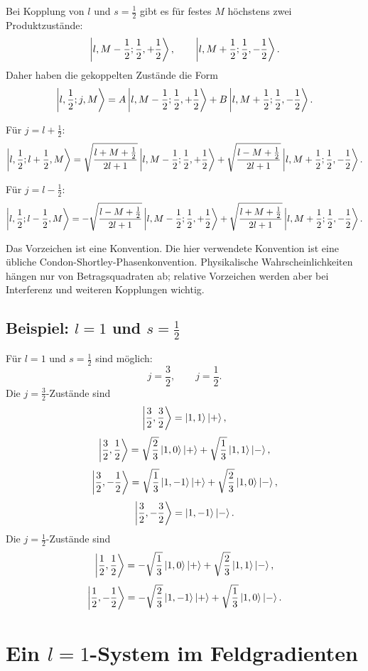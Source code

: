 Bei Kopplung von \(l\) und \(s=\frac12\) gibt es für festes \(M\) höchstens zwei Produktzustände:
\[
    \left|l,M-\frac12;\frac12,+\frac12\right\rangle,
    \qquad
    \left|l,M+\frac12;\frac12,-\frac12\right\rangle.
\]
Daher haben die gekoppelten Zustände die Form
\[
    \left|l,\frac12;j,M\right\rangle
    =A\left|l,M-\frac12;\frac12,+\frac12\right\rangle
    +B\left|l,M+\frac12;\frac12,-\frac12\right\rangle.
\]

Für \(j=l+\frac12\):
\[
    \left|l,\frac12;l+\frac12,M\right\rangle
    =\sqrt{\frac{l+M+\frac12}{2l+1}}
    \left|l,M-\frac12;\frac12,+\frac12\right\rangle
    +\sqrt{\frac{l-M+\frac12}{2l+1}}
    \left|l,M+\frac12;\frac12,-\frac12\right\rangle.
\]

Für \(j=l-\frac12\):
\[
    \left|l,\frac12;l-\frac12,M\right\rangle
    =-\sqrt{\frac{l-M+\frac12}{2l+1}}
    \left|l,M-\frac12;\frac12,+\frac12\right\rangle
    +\sqrt{\frac{l+M+\frac12}{2l+1}}
    \left|l,M+\frac12;\frac12,-\frac12\right\rangle.
\]

\begin{notebox}
Das Vorzeichen ist eine Konvention. Die hier verwendete Konvention ist eine übliche Condon-Shortley-Phasenkonvention. Physikalische Wahrscheinlichkeiten hängen nur von Betragsquadraten ab; relative Vorzeichen werden aber bei Interferenz und weiteren Kopplungen wichtig.
\end{notebox}

\subsection{Beispiel: \texorpdfstring{\(l=1\)}{l=1} und \texorpdfstring{\(s=\frac12\)}{s=1/2}}

Für \(l=1\) und \(s=\frac12\) sind möglich:
\[
    j=\frac32,
    \qquad
    j=\frac12.
\]
Die \(j=\frac32\)-Zustände sind
\[
    \left|\frac32,\frac32\right\rangle=\left|1,1\right\rangle\left|+\right\rangle,
\]
\[
    \left|\frac32,\frac12\right\rangle
    =\sqrt{\frac23}\left|1,0\right\rangle\left|+\right\rangle
    +\sqrt{\frac13}\left|1,1\right\rangle\left|-\right\rangle,
\]
\[
    \left|\frac32,-\frac12\right\rangle
    =\sqrt{\frac13}\left|1,-1\right\rangle\left|+\right\rangle
    +\sqrt{\frac23}\left|1,0\right\rangle\left|-\right\rangle,
\]
\[
    \left|\frac32,-\frac32\right\rangle=\left|1,-1\right\rangle\left|-\right\rangle.
\]
Die \(j=\frac12\)-Zustände sind
\[
    \left|\frac12,\frac12\right\rangle
    =-\sqrt{\frac13}\left|1,0\right\rangle\left|+\right\rangle
    +\sqrt{\frac23}\left|1,1\right\rangle\left|-\right\rangle,
\]
\[
    \left|\frac12,-\frac12\right\rangle
    =-\sqrt{\frac23}\left|1,-1\right\rangle\left|+\right\rangle
    +\sqrt{\frac13}\left|1,0\right\rangle\left|-\right\rangle.
\]

\section{Ein \texorpdfstring{\(l=1\)}{l=1}-System im Feldgradienten}

